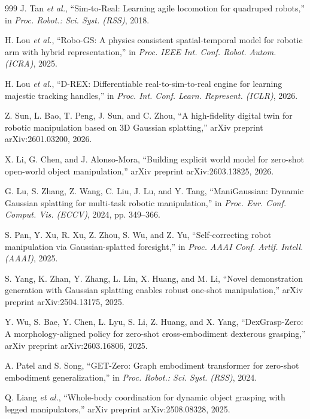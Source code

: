 \documentclass[12pt,a4paper,oneside]{report}
\begin{document}
\begin{thebibliography}{999}
J. Tan \textit{et al.}, ``{Sim-to-Real}: Learning agile locomotion for quadruped robots,'' in \textit{Proc. Robot.: Sci. Syst. (RSS)}, 2018.

H. Lou \textit{et al.}, ``{Robo-GS}: A physics consistent spatial-temporal model for robotic arm with hybrid representation,'' in \textit{Proc. IEEE Int. Conf. Robot. Autom. (ICRA)}, 2025.

H. Lou \textit{et al.}, ``D-REX: Differentiable real-to-sim-to-real engine for learning majestic tracking handles,'' in \textit{Proc. Int. Conf. Learn. Represent. (ICLR)}, 2026.

Z. Sun, L. Bao, T. Peng, J. Sun, and C. Zhou, ``A high-fidelity digital twin for robotic manipulation based on {3D} Gaussian splatting,'' arXiv preprint arXiv:2601.03200, 2026.

X. Li, G. Chen, and J. Alonso-Mora, ``Building explicit world model for zero-shot open-world object manipulation,'' arXiv preprint arXiv:2603.13825, 2026.

G. Lu, S. Zhang, Z. Wang, C. Liu, J. Lu, and Y. Tang, ``{ManiGaussian}: Dynamic Gaussian splatting for multi-task robotic manipulation,'' in \textit{Proc. Eur. Conf. Comput. Vis. (ECCV)}, 2024, pp. 349--366.

S. Pan, Y. Xu, R. Xu, Z. Zhou, S. Wu, and Z. Yu, ``Self-correcting robot manipulation via Gaussian-splatted foresight,'' in \textit{Proc. AAAI Conf. Artif. Intell. (AAAI)}, 2025.

S. Yang, K. Zhan, Y. Zhang, L. Lin, X. Huang, and M. Li, ``Novel demonstration generation with Gaussian splatting enables robust one-shot manipulation,'' arXiv preprint arXiv:2504.13175, 2025.

Y. Wu, S. Bae, Y. Chen, L. Lyu, S. Li, Z. Huang, and X. Yang, ``{DexGrasp-Zero}: A morphology-aligned policy for zero-shot cross-embodiment dexterous grasping,'' arXiv preprint arXiv:2603.16806, 2025.

A. Patel and S. Song, ``{GET-Zero}: Graph embodiment transformer for zero-shot embodiment generalization,'' in \textit{Proc. Robot.: Sci. Syst. (RSS)}, 2024.

Q. Liang \textit{et al.}, ``Whole-body coordination for dynamic object grasping with legged manipulators,'' arXiv preprint arXiv:2508.08328, 2025.


\end{thebibliography}
\end{document}
